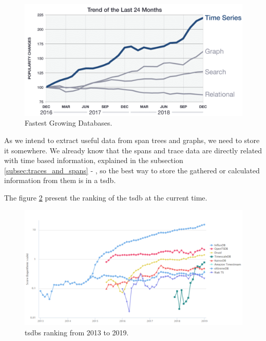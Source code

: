 \begin{figure}
    \centering
    \includegraphics[width=1.0\textwidth]{images/popularity_of_time_series_databases.pdf}
    \caption{Fastest Growing Databases.\cite{time_series_databases_explained}}
    \label{fig:fastest_growing_databases}
\end{figure}


As we intend to extract useful data from span trees and graphs, we need to store it somewhere. We already know that the spans and trace data are directly related with time based information, explained in the subsection \ref{subsec:traces_and_spans} - , so the best way to store the gathered or calculated information from them is in a \gls{tsdb}.

The figure \ref{fig:time_series_databases_ranking} present the ranking of the \gls{tsdb} at the current time\cite{tsdb_ranking}.

\begin{figure}[h!]
    \centering
    \includegraphics[width=1.00\textwidth]{images/time_series_databases_ranking.pdf}
    \caption{\gls{tsdb}s ranking from 2013 to 2019.}
    \label{fig:time_series_databases_ranking}
\end{figure}

